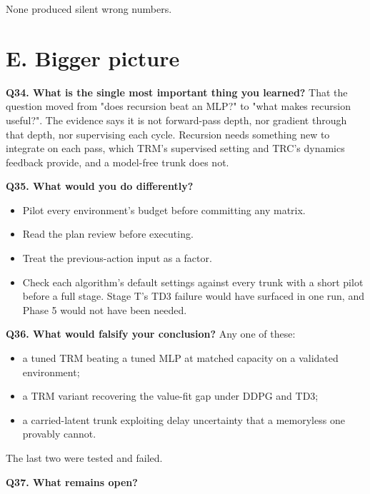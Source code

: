 \documentclass[11pt]{article}
\begin{document}
None produced silent wrong numbers.



\section*{E. Bigger picture}



\textbf{Q34. What is the single most important thing you learned?} That the question moved from "does recursion beat an MLP?" to "what makes recursion useful?". The evidence says it is not forward-pass depth, nor gradient through that depth, nor supervising each cycle. Recursion needs something new to integrate on each pass, which TRM's supervised setting and TRC's dynamics feedback provide, and a model-free trunk does not.



\textbf{Q35. What would you do differently?}

\begin{itemize}
\item Pilot every environment's budget before committing any matrix.
\item Read the plan review before executing.
\item Treat the previous-action input as a factor.
\item Check each algorithm's default settings against every trunk with a short pilot before a full stage. Stage T's TD3 failure would have surfaced in one run, and Phase 5 would not have been needed.
\end{itemize}



\textbf{Q36. What would falsify your conclusion?} Any one of these:

\begin{itemize}
\item a tuned TRM beating a tuned MLP at matched capacity on a validated environment;
\item a TRM variant recovering the value-fit gap under DDPG and TD3;
\item a carried-latent trunk exploiting delay uncertainty that a memoryless one provably cannot.
\end{itemize}



The last two were tested and failed.



\textbf{Q37. What remains open?}
\end{document}

